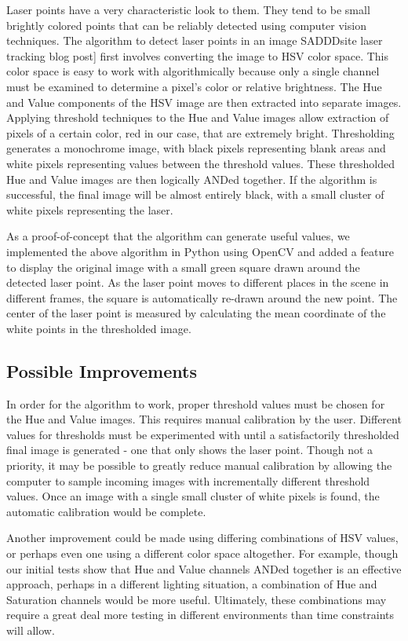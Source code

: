 \documentclass[10pt,twocolumn,letterpaper]{article}
\begin{document}
Laser points have a very characteristic look to them. They tend to be small brightly colored points that can be reliably detected using computer vision techniques. The algorithm to detect laser points in an image SADDDsite laser tracking blog post] first involves converting the image to HSV color space. This color space is easy to work with algorithmically because only a single channel must be examined to determine a pixel's color or relative brightness. The Hue and Value components of the HSV image are then extracted into separate images. Applying threshold techniques to the Hue and Value images allow extraction of pixels of a certain color, red in our case, that are extremely bright.  Thresholding generates a monochrome image, with black pixels representing blank areas and white pixels representing values between the threshold values.  These thresholded Hue and Value images are then logically ANDed together.  If the algorithm is successful, the final image will be almost entirely black, with a small cluster of white pixels representing the laser.

As a proof-of-concept that the algorithm can generate useful values, we implemented the above algorithm in Python using OpenCV and added a feature to display the original image with a small green square drawn around the detected laser point.  As the laser point moves to different places in the scene in different frames, the square is automatically re-drawn around the new point. The center of the laser point is measured by calculating the mean coordinate of the white points in the thresholded image.

\subsection{Possible Improvements}

In order for the algorithm to work, proper threshold values must be chosen for the Hue and Value images.  This requires manual calibration by the user.  Different values for thresholds must be experimented with until a satisfactorily thresholded final image is generated - one that only shows the laser point.  Though not a priority, it may be possible to greatly reduce manual calibration by allowing the computer to sample incoming images with incrementally different threshold values.  Once an image with a single small cluster of white pixels is found, the automatic calibration would be complete.

Another improvement could be made using differing combinations of HSV values, or perhaps even one using a different color space altogether.  For example, though our initial tests show that Hue and Value channels ANDed together is an effective approach, perhaps in a different lighting situation, a combination of Hue and Saturation channels would be more useful.  Ultimately, these combinations may require a great deal more testing in different environments than time constraints will allow. 
\end{document}
